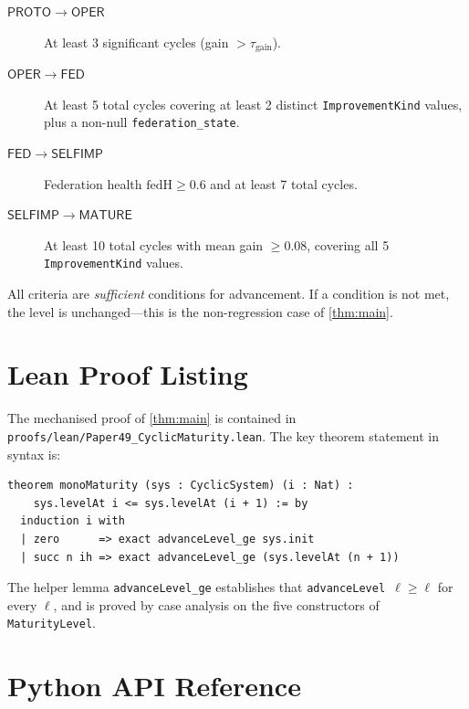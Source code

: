 \documentclass[11pt]{article}
\newcommand{\fedH}{\mathrm{fedH}}           %
\newcommand{\Proto}{\ensuremath{\mathsf{PROTO}}}
\newcommand{\Oper}{\ensuremath{\mathsf{OPER}}}
\newcommand{\Fed}{\ensuremath{\mathsf{FED}}}
\newcommand{\SelfImp}{\ensuremath{\mathsf{SELFIMP}}}
\newcommand{\Matur}{\ensuremath{\mathsf{MATURE}}}
\newcommand{\gainT}{\tau_{\mathrm{gain}}}
\begin{document}
\begin{description}
  \item[$\Proto \to \Oper$]  At least 3 significant cycles (gain $> \gainT$).
  \item[$\Oper \to \Fed$]  At least 5 total cycles covering at least 2
    distinct \texttt{ImprovementKind} values, plus a non-null
    \texttt{federation\_state}.
  \item[$\Fed \to \SelfImp$]  Federation health $\fedH \geq 0.6$ and
    at least 7 total cycles.
  \item[$\SelfImp \to \Matur$]  At least 10 total cycles with mean gain
    $\geq 0.08$, covering all 5 \texttt{ImprovementKind} values.
\end{description}

All criteria are \emph{sufficient} conditions for advancement.  If a
condition is not met, the level is unchanged—this is the non-regression case
of \cref{thm:main}.

\section{Lean Proof Listing}\label{app:lean}

The mechanised proof of \cref{thm:main} is contained in
\texttt{proofs/lean/Paper49\_CyclicMaturity.lean}.  The key theorem statement
in \LEAN{} syntax is:

\begin{lstlisting}[style=jugeo-output,
  caption={Lean statement of Monotonic Maturity.}]
theorem monoMaturity (sys : CyclicSystem) (i : Nat) :
    sys.levelAt i <= sys.levelAt (i + 1) := by
  induction i with
  | zero      => exact advanceLevel_ge sys.init
  | succ n ih => exact advanceLevel_ge (sys.levelAt (n + 1))
\end{lstlisting}

The helper lemma \texttt{advanceLevel\_ge} establishes that
\texttt{advanceLevel $\ell \geq \ell$} for every $\ell$, and is proved by
case analysis on the five constructors of \texttt{MaturityLevel}.

\section{Python API Reference}\label{app:api}
\end{document}
